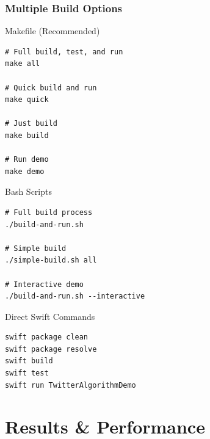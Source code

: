 \documentclass[aspectratio=169]{beamer}
\begin{document}
\begin{frame}
    \frametitle{Multiple Build Options}
    \begin{block}{Makefile (Recommended)}
        \begin{verbatim}
# Full build, test, and run
make all

# Quick build and run
make quick

# Just build
make build

# Run demo
make demo
        \end{verbatim}
    \end{block}
    
    \begin{block}{Bash Scripts}
        \begin{verbatim}
# Full build process
./build-and-run.sh

# Simple build
./simple-build.sh all

# Interactive demo
./build-and-run.sh --interactive
        \end{verbatim}
    \end{block}
    
    \begin{block}{Direct Swift Commands}
        \begin{verbatim}
swift package clean
swift package resolve
swift build
swift test
swift run TwitterAlgorithmDemo
        \end{verbatim}
    \end{block}
\end{frame}

\section{Results \& Performance}
\end{document}
